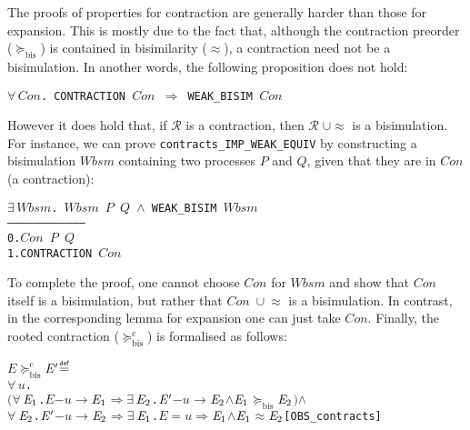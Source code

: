 \documentclass[GCNS]{yincog}
\renewcommand{\HOLinline}[1]{\mbox{\textup{\texttt{#1}}}}
\renewcommand{\HOLConst}[1]{\texttt{#1}}
\renewcommand{\HOLBoundVar}[1]{\ensuremath{\mathit{#1}}}
\renewcommand{\HOLFreeVar}[1]{\ensuremath{\mathit{#1}}}
\renewcommand{\HOLSymConst}[1]{#1}
\renewcommand{\HOLTokenConj}{\ensuremath{\wedge}}
\renewcommand{\HOLTokenDefEquality}{\ensuremath{\mathrel{\overset{\makebox [0pt]{\text{\tiny \textsf{def}}}}{=}}}}
\renewcommand{\HOLTokenExists}{\ensuremath{\exists \,}}
\renewcommand{\HOLTokenForall}{\ensuremath{\forall \,}}
\theoremstyle{remark}
\theoremstyle{theorem}
\theoremstyle{remark}
\newcommand{\HOLTokenWeakEQ}{$\approx$}
\newcommand{\HOLTokenTransBegin}{$-$}
\newcommand{\HOLTokenTransEnd}{$\rightarrow$\xspace}
\newcommand{\HOLTokenWeakTransBegin}{$=$}
\newcommand{\HOLTokenWeakTransEnd}{$\Rightarrow$\xspace}
\newcommand{\HOLTokenContracts}{$\succeq_{\mathrm{bis}}\!$}
\newcommand{\HOLTokenObsContracts}{$\succeq^{\mathrm{c}}_{\mathrm{bis}}\!$}
\renewcommand{\HOLTokenImp}{\ensuremath{\Longrightarrow}}
\def\Rvtex{\mathcal{R}}
\newcommand{\wbvtex}{\approx}
\newcommand{\mcontrBIS}{\mathrel{\succeq_{\mathrm{bis}}}}
\newcommand{\rcontr}{\mathrel{\succeq^{\mathrm{c}}_{\mathrm{bis}}}}
\begin{document}
The proofs of properties for contraction are generally harder than those
for expansion. This is mostly due to the fact that, although the contraction
preorder ($\mcontrBIS $) is contained in bisimilarity ($\wbvtex $), a contraction
need not be a bisimulation. In another words, the following proposition
does not hold:
%
\begin{alltt}
   \HOLinline{\HOLSymConst{\HOLTokenForall{}}\HOLBoundVar{Con}. \HOLConst{CONTRACTION} \HOLBoundVar{Con} \HOLSymConst{\HOLTokenImp{}} \HOLConst{WEAK\_BISIM} \HOLBoundVar{Con}}
\end{alltt}
%
However it does hold that, if $\Rvtex $ is a contraction, then
$\Rvtex \;\cup \wbvtex $ is a bisimulation. For instance, we can prove
\texttt{contracts\_IMP\_WEAK\_EQUIV} by constructing a bisimulation
\HOLinline{\HOLFreeVar{Wbsm}} containing two processes $P$ and $Q$, given
that they are in $Con$ (a contraction):
%
\begin{alltt}
        \HOLinline{\HOLSymConst{\HOLTokenExists{}}\HOLBoundVar{Wbsm}. \HOLBoundVar{Wbsm} \HOLFreeVar{P} \HOLFreeVar{Q} \HOLSymConst{\HOLTokenConj{}} \HOLConst{WEAK\_BISIM} \HOLBoundVar{Wbsm}}
   ------------------------------------
    0.  \HOLinline{\HOLFreeVar{Con} \HOLFreeVar{P} \HOLFreeVar{Q}}
    1.  \HOLinline{\HOLConst{CONTRACTION} \HOLFreeVar{Con}}
\end{alltt}
%
To complete the proof, one cannot choose $Con$ for $Wbsm$ and show that
$Con$ itself is a bisimulation, but rather that
$Con\;\cup \!\wbvtex $ is a bisimulation. In contrast, in the corresponding
lemma for expansion one can just take $Con$. Finally, the rooted contraction
($\rcontr $) is formalised as follows:
%
\begin{alltt}
   \HOLFreeVar{E} \HOLSymConst{\HOLTokenObsContracts} \ensuremath{\HOLFreeVar{E}\sp{\prime}} \HOLTokenDefEquality{}
     \HOLSymConst{\HOLTokenForall{}}\HOLBoundVar{u}.
         \ensuremath{(}\HOLSymConst{\HOLTokenForall{}}\ensuremath{\HOLBoundVar{E}\sb{\mathrm{1}}}. \HOLFreeVar{E} \HOLTokenTransBegin\HOLBoundVar{u}\HOLTokenTransEnd \ensuremath{\HOLBoundVar{E}\sb{\mathrm{1}}} \HOLSymConst{\HOLTokenImp{}} \HOLSymConst{\HOLTokenExists{}}\ensuremath{\HOLBoundVar{E}\sb{\mathrm{2}}}. \ensuremath{\HOLFreeVar{E}\sp{\prime}} \HOLTokenTransBegin\HOLBoundVar{u}\HOLTokenTransEnd \ensuremath{\HOLBoundVar{E}\sb{\mathrm{2}}} \HOLSymConst{\HOLTokenConj{}} \ensuremath{\HOLBoundVar{E}\sb{\mathrm{1}}} \HOLSymConst{\HOLTokenContracts{}} \ensuremath{\HOLBoundVar{E}\sb{\mathrm{2}}}\ensuremath{)} \HOLSymConst{\HOLTokenConj{}}
         \HOLSymConst{\HOLTokenForall{}}\ensuremath{\HOLBoundVar{E}\sb{\mathrm{2}}}. \ensuremath{\HOLFreeVar{E}\sp{\prime}} \HOLTokenTransBegin\HOLBoundVar{u}\HOLTokenTransEnd \ensuremath{\HOLBoundVar{E}\sb{\mathrm{2}}} \HOLSymConst{\HOLTokenImp{}} \HOLSymConst{\HOLTokenExists{}}\ensuremath{\HOLBoundVar{E}\sb{\mathrm{1}}}. \HOLFreeVar{E} \HOLTokenWeakTransBegin\HOLBoundVar{u}\HOLTokenWeakTransEnd \ensuremath{\HOLBoundVar{E}\sb{\mathrm{1}}} \HOLSymConst{\HOLTokenConj{}} \ensuremath{\HOLBoundVar{E}\sb{\mathrm{1}}} \HOLSymConst{\HOLTokenWeakEQ} \ensuremath{\HOLBoundVar{E}\sb{\mathrm{2}}}\hfill{[OBS\_contracts]}
\end{alltt}
\end{document}
